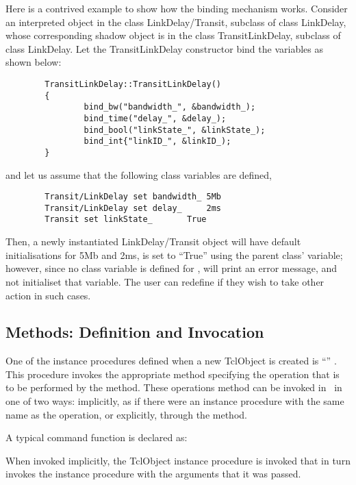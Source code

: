 \documentclass{article}
\begin{document}
Here is a contrived example to show how the binding mechanism works.
Consider an interpreted object in the class LinkDelay/Transit,
subclass of class LinkDelay, whose corresponding shadow object is in 
the class TransitLinkDelay, subclass of class LinkDelay.
Let the TransitLinkDelay constructor bind the variables as shown below:
\begin{verbatim}
        TransitLinkDelay::TransitLinkDelay()
        {
                bind_bw("bandwidth_", &bandwidth_);
                bind_time("delay_", &delay_);
                bind_bool("linkState_", &linkState_);
                bind_int{"linkID_", &linkID_);
        }
\end{verbatim}
and let us assume that the following class variables are defined,
\begin{verbatim}
        Transit/LinkDelay set bandwidth_ 5Mb
        Transit/LinkDelay set delay_     2ms
        Transit set linkState_       True
\end{verbatim}
Then, a newly instantiated LinkDelay/Transit object will have 
default initialisations for   5Mb and  2ms,
 is set to ``True'' using the parent class' variable;
however, since no class variable is defined for ,
 will print an error message, and
not initialiset that variable.
The user can redefine 
if they wish to take other action in such cases.

\subsection{ Methods: Definition and Invocation}
\label{sec:Commands}

One of the instance procedures defined
when a new TclObject is created is ``'' .
This procedure invokes the appropriate  method 
specifying the operation that is to be performed by the method.
These operations method can be invoked in \ns\ in one of two ways:
implicitly, as if there were an instance procedure
with the same name as the operation,  or
explicitly, through the  method.

A typical command function is declared as:

When invoked implicitly, the TclObject instance procedure
is invoked that in turn invokes the  instance procedure
with the arguments that it was passed.
\end{document}
